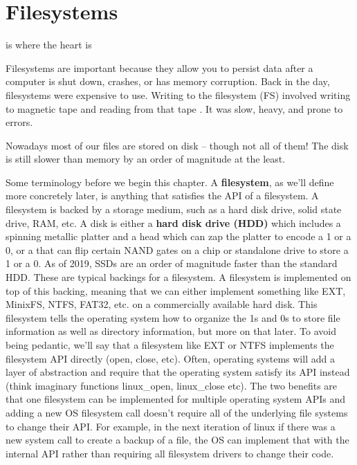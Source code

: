 \chapter{Filesystems}

\epigraph{ is where the heart is}{}

Filesystems are important because they allow you to persist data after a computer is shut down, crashes, or has memory corruption.
Back in the day, filesystems were expensive to use.
Writing to the filesystem (FS) involved writing to magnetic tape and reading from that tape \cite{iec}.
It was slow, heavy, and prone to errors.

Nowadays most of our files are stored on disk -- though not all of them!
The disk is still slower than memory by an order of magnitude at the least.

Some terminology before we begin this chapter.
A \textbf{filesystem}, as we'll define more concretely later, is anything that satisfies the API of a filesystem.
A filesystem is backed by a storage medium, such as a hard disk drive, solid state drive, RAM, etc.
A disk is either a \textbf{hard disk drive (HDD)} which includes a spinning metallic platter and a head which can zap the platter to encode a 1 or a 0, or a  that can flip certain NAND gates on a chip or standalone drive to store a 1 or a 0.
As of 2019, SSDs are an order of magnitude faster than the standard HDD.
These are typical backings for a filesystem.
A filesystem is implemented on top of this backing, meaning that we can either implement something like EXT, MinixFS, NTFS, FAT32, etc. on a commercially available hard disk.
This filesystem tells the operating system how to organize the 1s and 0s to store file information as well as directory information, but more on that later.
To avoid being pedantic, we'll say that a filesystem like EXT or NTFS implements the filesystem API directly (open, close, etc).
Often, operating systems will add a layer of abstraction and require that the operating system satisfy its API instead (think imaginary functions linux\_open, linux\_close etc).
The two benefits are that one filesystem can be implemented for multiple operating system APIs and adding a new OS filesystem call doesn't require all of the underlying file systems to change their API.
For example, in the next iteration of linux if there was a new system call to create a backup of a file, the OS can implement that with the internal API rather than requiring all filesystem drivers to change their code.

